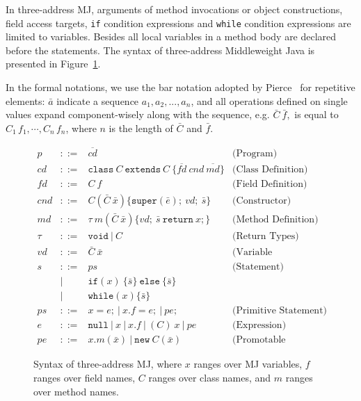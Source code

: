 \documentclass[a4paper, USenglish]{lipics-v2016}
\newenvironment{smpage}[1]
{\begin{lrbox}{\fmbox}\begin{minipage}{#1}}
{\end{minipage}\end{lrbox}\usebox{\fmbox}}
\newcommand{\code}[1]{\texttt{\footnotesize #1}}
\theoremstyle{plain}
\begin{document}
In three-address MJ, arguments of method invocations or object constructions, field access targets, \code{if} condition expressions and \code{while} condition expressions are limited to variables. Besides all local variables in a method body are declared before the statements.
The syntax of three-address Middleweight Java is presented in
Figure~\ref{mj-syntax}. 

In the formal notations, we use the bar notation adopted by Pierce~\cite{Pierce:2002:TPL:509043}
for repetitive elements: $\bar{a}$ indicate a sequence $a_1,a_2,...,a_n$, 
and all operations defined on single values expand
component-wisely along with the sequence, e.g. $\bar{C}\ \bar{f},$ is equal to $C_{1}\,f_{1},\cdots,
C_{n}\,f_{n}$, where $n$ is the length of $\bar{C}$ and $\bar{f}$.

\begin{figure}[ht!]\footnotesize
\begin{center}
\begin{smpage}{0.7\columnwidth}
\[
\begin{array}{ccll}
p   &::=& \overline{\mathit{cd}}& \text{(Program)} \\
\mathit{cd}   &::=& \mathtt{class}~C~\mathtt{extends}~C~\{\overline{\mathit{fd}}~cnd~\overline{\mathit{md}}\} & \text{(Class Definition)}\\
\mathit{fd}   &::=& C~f & \text{(Field Definition)}\\
\mathit{cnd} &::=& C(\bar{C}~\bar{x})\{\mathtt{super}(\bar{e});~\mathit{vd};~\bar{s}\} & \text{(Constructor)}\\
\mathit{md}   &::=& \tau~m(\bar{C}~\bar{x})\{vd;~\bar{s}~\mathtt{return}~x;\} & \text{(Method Definition)}\\
\tau &::=& \mathtt{void} ~|~ C & \text{(Return Types)}\\
\mathit{vd} &::=& \bar{C}~\bar{x} & \text{(Variable Declaration)}\\
s &::=& \mathit{ps} & \text{(Statement)}\\
  & | & \mathtt{if}(x)~\{\bar{s}\}~\mathtt{else}~\{\bar{s}\}\\
  & | & \mathtt{while}(x)\{\bar{s}\} \\
\mathit{ps}   &::=& x=e; ~|~ x.f=e; ~|~ \mathit{pe}; & \text{(Primitive Statement})\\
e   &::=& \mathtt{null} ~|~ x ~|~ x.f ~|~ (C)~x ~|~ \mathit{pe} & \text{(Expression)}\\
\mathit{pe}   &::=& x.m(\bar{x}) ~|~ \mathtt{new}~C(\bar{x}) & \text{(Promotable Expression)}
\end{array}
\]
\end{smpage}
\end{center}
\vspace{-10pt}
\caption{Syntax of three-address MJ, where $x$ ranges over MJ variables, $f$ ranges over field names, $C$
ranges over class names, and $m$ ranges over method names.}
\label{mj-syntax}
\end{figure}
\vspace{-15pt}
\end{document}
